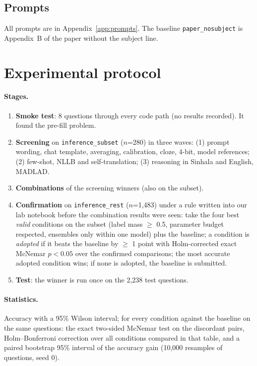 \documentclass[10pt,a4paper]{article}
\newcommand{\cond}[1]{\texttt{#1}}
\begin{document}
\subsection{Prompts}
All prompts are in Appendix~\ref{app:prompts}. The baseline \cond{paper\_nosubject} is Appendix~B of the paper
without the subject line.

\section{Experimental protocol}\label{sec:protocol}
\paragraph{Stages.}
\begin{enumerate}
\item \textbf{Smoke test}: 8 questions through every code path (no results recorded). It found the pre-fill problem.
\item \textbf{Screening} on \texttt{inference\_subset} ($n$=280) in three waves: (1) prompt wording, chat template,
averaging, calibration, cloze, 4-bit, model references; (2) few-shot, NLLB and self-translation; (3) reasoning in
Sinhala and English, MADLAD.
\item \textbf{Combinations} of the screening winners (also on the subset).
\item \textbf{Confirmation} on \texttt{inference\_rest} ($n$=1,483) under a rule written into our lab notebook
before the combination results were seen: take the four best \emph{valid} conditions on the subset (label mass
$\ge$ 0.5, parameter budget respected, ensembles only within one model) plus the baseline; a condition is
\emph{adopted} if it beats the baseline by $\ge$ 1 point with Holm-corrected exact McNemar $p<0.05$ over the
confirmed comparisons; the most accurate adopted condition wins; if none is adopted, the baseline is submitted.
\item \textbf{Test}: the winner is run once on the 2,238 test questions.
\end{enumerate}

\paragraph{Statistics.} Accuracy with a 95\% Wilson interval; for every condition against the baseline on the same
questions: the exact two-sided McNemar test on the discordant pairs, Holm--Bonferroni correction over all conditions
compared in that table, and a paired bootstrap 95\% interval of the accuracy gain (10,000 resamples of questions,
seed 0).
\end{document}
